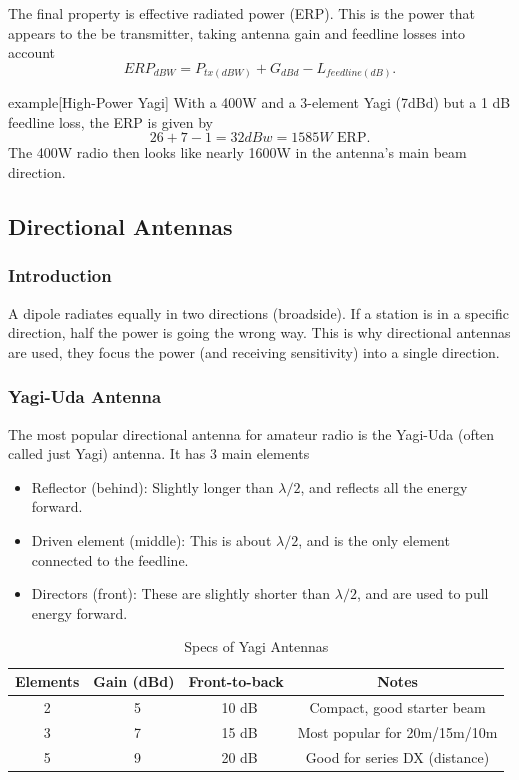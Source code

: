 \documentclass{article}
\begin{document}
The final property is effective radiated power (ERP). This is the power that appears to the be transmitter, taking antenna gain and feedline losses into account
\[
    ERP_{dBW}=P_{tx(dBW)}+G_{dBd}-L_{feedline(dB)}.
\]
\begin{callout}{example}[High-Power Yagi]
    With a 400W and a 3-element Yagi (7dBd) but a 1 dB feedline loss, the ERP is given by
    \[
        26+7-1=32dBw=1585W \text{ ERP}.
    \]
    The 400W radio then looks like nearly 1600W in the antenna's main beam direction.
\end{callout}

\subsection{Directional Antennas}
\subsubsection{Introduction}
A dipole radiates equally in two directions (broadside). If a station is in a specific direction, half the power is going the wrong way. This is why directional antennas are used, they focus the power (and receiving sensitivity) into a single direction.

\subsubsection{Yagi-Uda Antenna}
The most popular directional antenna for amateur radio is the Yagi-Uda (often called just Yagi) antenna. It has 3 main elements
\begin{itemize}
    \item Reflector (behind): Slightly longer than $\lambda /2$, and reflects all the energy forward.
    \item Driven element (middle): This is about $\lambda /2$, and is the only element connected to the feedline.
    \item Directors (front): These are slightly shorter than $\lambda /2$, and are used to pull energy forward.
\end{itemize}

\begin{table}[h]
    \centering
    \caption{Specs of Yagi Antennas}
    \label{tab:6}
    \begin{tabular}{c|c|c|c}
        Elements & Gain (dBd) & Front-to-back & Notes \\
        \hline
        \hline
        2 & ~5 & ~10 dB & Compact, good starter beam \\
        3 & ~7 & ~15 dB & Most popular for 20m/15m/10m \\
        5 & ~9 & ~20 dB & Good for series DX (distance)
    \end{tabular}
\end{table}
\end{document}
